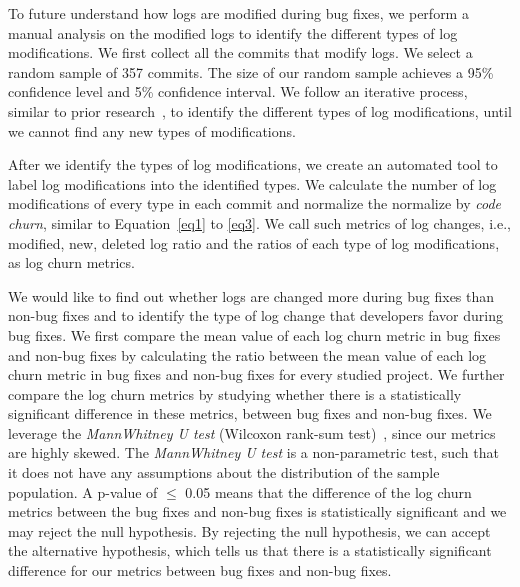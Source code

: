 
To future understand how logs are modified during bug fixes, we perform a manual analysis on the modified logs to identify the different types of log modifications. We first collect all the commits that modify logs. We select a random sample of 357 commits. The size of our random sample achieves a 95\% confidence level and 5\% confidence interval. We follow an iterative process, similar to prior research~\cite{seaman1999qualitative}, to identify the different types of log modifications, until we cannot find any new types of modifications. 

After we identify the types of log modifications, we create an automated tool to label log modifications into the identified types. We calculate the number of log modifications of every type in each commit and normalize the normalize by {\em code churn}, similar to Equation~\ref{eq1} to \ref{eq3}. We call such metrics of log changes, i.e., modified, new, deleted log ratio and the ratios of each type of log modifications, as log churn metrics.

We would like to find out whether logs are changed more during bug fixes than non-bug fixes and to identify the type of log change that developers favor during bug fixes. We first compare the mean value of each log churn metric in bug fixes and non-bug fixes by calculating the ratio between the mean value of each log churn metric in bug fixes and non-bug fixes for every studied project. We further compare the log churn metrics by studying whether there is a statistically significant difference in these metrics, between bug fixes and non-bug fixes. We leverage the \textsl{MannWhitney U test} (Wilcoxon rank-sum test)~\cite{Gehan1965}, since our metrics are highly skewed. The {\em MannWhitney U test} is a non-parametric test, such that it does not have any assumptions about the distribution of the sample population. A p-value of \ensuremath{\le} 0.05 means that the difference of the log churn metrics between the bug fixes and non-bug fixes is statistically significant and we may reject the null hypothesis. By rejecting the null hypothesis, we can accept the alternative hypothesis, which tells us that there is a statistically significant difference for our metrics between bug fixes and non-bug fixes.

